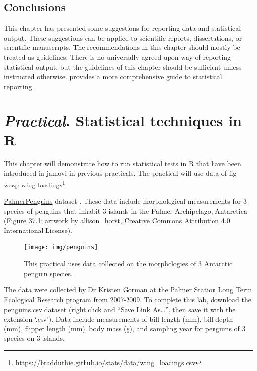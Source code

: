 \documentclass[
]{scrbook}
\begin{document}
\hypertarget{conclusions}{%
\section{Conclusions}\label{conclusions}}

This chapter has presented some suggestions for reporting data and statistical output.
These suggestions can be applied to scientific reports, dissertations, or scientific manuscripts.
The recommendations in this chapter should mostly be treated as guidelines.
There is no universally agreed upon way of reporting statistical output, but the guidelines of this chapter should be sufficient unless instructed otherwise.
\citet{Lang1997} provides a more comprehensive guide to statistical reporting.

\hypertarget{Chapter_39}{%
\chapter{\texorpdfstring{\emph{Practical}. Statistical techniques in R}{Practical. Statistical techniques in R}}\label{Chapter_39}}

This chapter will demonstrate how to run statistical tests in R that have been introduced in jamovi in previous practicals.
The practical will use data of fig wasp wing loadings\footnote{\url{https://bradduthie.github.io/stats/data/wing_loadings.csv}}.

\href{https://allisonhorst.github.io/palmerpenguins/articles/intro.html\#package-citation-1}{PalmerPenguins} dataset \citep{GormanEtAl2014, HorstEtAl2020}.
These data include morphological measurements for 3 species of penguins that inhabit 3 islands in the Palmer Archipelago, Antarctica (Figure 37.1; artwork by \href{https://allisonhorst.com/}{allison\_horst}, Creative Commons Attribution 4.0 International License).

\begin{figure}
\texttt{[image: img/penguins]} \caption{This practical uses data collected on the morphologies of 3 Antarctic penguin species.}\label{fig:unnamed-chunk-219}
\end{figure}

The data were collected by Dr Kristen Gorman at the \href{https://pal.lternet.edu/}{Palmer Station} Long Term Ecological Research program from 2007-2009.
To complete this lab, download the \href{https://raw.githubusercontent.com/bradduthie/SCIU4T4/main/data/penguins.csv}{penguins.csv} dataset (right click and ``Save Link As\ldots{}'', then save it with the extension `.csv').
Data include measurements of bill length (mm), bill depth (mm), flipper length (mm), body mass (g), and sampling year for penguins of 3 species on 3 islands.
\end{document}
